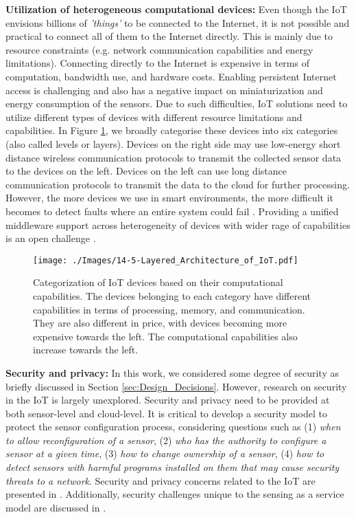 \documentclass[graybox]{svmult}
\newcommand{\things}{\textit{'things' }}
\begin{document}
\textbf{Utilization of heterogeneous computational devices:} Even though the IoT envisions billions of \things to be connected to the Internet, it is not possible and practical to connect all of them to the Internet directly. This is mainly due to resource constraints (e.g. network communication capabilities and energy limitations).  Connecting directly to the Internet is expensive in terms of computation, bandwidth use, and hardware costs. Enabling persistent Internet access is challenging and also has a negative impact on miniaturization and energy consumption of the sensors. Due to such difficulties, IoT solutions need to utilize different types of devices with different resource limitations and capabilities. In Figure  \ref{Figure:Layered_Architecture}, we broadly categorise these devices into six categories (also called levels or layers). Devices on the  right side may use low-energy short distance wireless communication protocols to transmit the collected sensor data to the devices on the left. Devices on the left can use long distance communication protocols to transmit the data to the cloud for further processing. However, the more devices we use in smart environments, the more difficult it becomes to detect faults where an entire system could fail \cite{E3}. Providing a unified middleware support across heterogeneity of devices with wider rage of capabilities is an open challenge \cite{E9, E10}.





\begin{figure}[h]
\texttt{[image: ./Images/14-5-Layered\_Architecture\_of\_IoT.pdf]}
\caption{Categorization of IoT devices based on their computational capabilities. The devices belonging to each category have different capabilities in terms of processing, memory, and communication.  They are also different in price, with devices becoming more expensive towards the left. The computational capabilities also increase towards the left.}
 \label{Figure:Layered_Architecture}	
\vspace{-0.20cm}	
\end{figure}



\textbf{Security and privacy:} In this work, we considered some degree of security as briefly discussed in Section \ref{sec:Design_Decisions}. However, research on security in the IoT is largely unexplored. Security and privacy need to be provided at both sensor-level and cloud-level. It is critical to develop a security model to protect the sensor configuration process, considering questions such as (1) \textit{when to allow reconfiguration of a sensor}, (2) \textit{who has the authority to configure a sensor at a given time}, (3) \textit{how to change ownership of a sensor}, (4) \textit{how to detect sensors with harmful programs installed on them that may cause security threats to a network}. Security and privacy concerns related to the IoT are presented in \cite{P632}. Additionally, security challenges unique to the sensing as a service model are discussed in \cite{ZMP008}.
\end{document}
